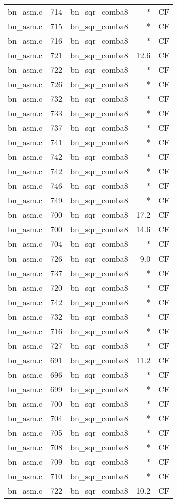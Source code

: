 \begin{table}[h!]
\begin{tabular}{lrlrr}
bn\_asm.c& 714&bn\_sqr\_comba8&*&CF\\
bn\_asm.c& 715&bn\_sqr\_comba8&*&CF\\
bn\_asm.c& 716&bn\_sqr\_comba8&*&CF\\
bn\_asm.c& 721&bn\_sqr\_comba8&12.6 &CF\\
bn\_asm.c& 722&bn\_sqr\_comba8&*&CF\\
bn\_asm.c& 726&bn\_sqr\_comba8&*&CF\\
bn\_asm.c& 732&bn\_sqr\_comba8&*&CF\\
bn\_asm.c& 733&bn\_sqr\_comba8&*&CF\\
bn\_asm.c& 737&bn\_sqr\_comba8&*&CF\\
bn\_asm.c& 741&bn\_sqr\_comba8&*&CF\\
bn\_asm.c& 742&bn\_sqr\_comba8&*&CF\\
bn\_asm.c& 742&bn\_sqr\_comba8&*&CF\\
bn\_asm.c& 746&bn\_sqr\_comba8&*&CF\\
bn\_asm.c& 749&bn\_sqr\_comba8&*&CF\\
bn\_asm.c& 700&bn\_sqr\_comba8&17.2 &CF\\
bn\_asm.c& 700&bn\_sqr\_comba8&14.6 &CF\\
bn\_asm.c& 704&bn\_sqr\_comba8&*&CF\\
bn\_asm.c& 726&bn\_sqr\_comba8&9.0 &CF\\
bn\_asm.c& 737&bn\_sqr\_comba8&*&CF\\
bn\_asm.c& 720&bn\_sqr\_comba8&*&CF\\
bn\_asm.c& 742&bn\_sqr\_comba8&*&CF\\
bn\_asm.c& 732&bn\_sqr\_comba8&*&CF\\
bn\_asm.c& 716&bn\_sqr\_comba8&*&CF\\
bn\_asm.c& 727&bn\_sqr\_comba8&*&CF\\
bn\_asm.c& 691&bn\_sqr\_comba8&11.2 &CF\\
bn\_asm.c& 696&bn\_sqr\_comba8&*&CF\\
bn\_asm.c& 699&bn\_sqr\_comba8&*&CF\\
bn\_asm.c& 700&bn\_sqr\_comba8&*&CF\\
bn\_asm.c& 704&bn\_sqr\_comba8&*&CF\\
bn\_asm.c& 705&bn\_sqr\_comba8&*&CF\\
bn\_asm.c& 708&bn\_sqr\_comba8&*&CF\\
bn\_asm.c& 709&bn\_sqr\_comba8&*&CF\\
bn\_asm.c& 710&bn\_sqr\_comba8&*&CF\\
bn\_asm.c& 722&bn\_sqr\_comba8&10.2 &CF\\

\end{tabular}
\end{table}

